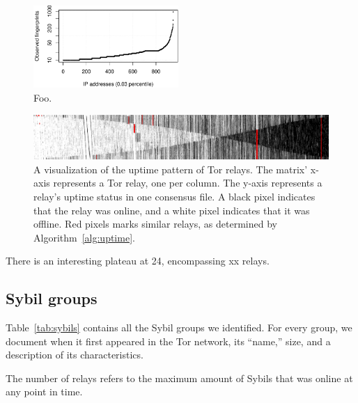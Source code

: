 \begin{figure}[t]
	\centering
	\includegraphics[width=0.49\textwidth]{diagrams/fingerprints.pdf}
	\caption{Foo.}
	\label{fig:fingerprints}
\end{figure}

\begin{figure}[t]
	\centering
	\includegraphics[width=\textwidth]{diagrams/uptimes.pdf}
	\caption{A visualization of the uptime pattern of Tor relays.  The matrix'
	x-axis represents a Tor relay, one per column.  The y-axis represents a
	relay's uptime status in one consensus file.  A black pixel indicates that
	the relay was online, and a white pixel indicates that it was offline.  Red
	pixels marks similar relays, as determined by Algorithm~\ref{alg:uptime}.}
	\label{fig:fingerprints}
\end{figure}

There is an interesting plateau at 24, encompassing xx relays.

\subsection{Sybil groups}
\label{sec:sybil_groups}
Table~\ref{tab:sybils} contains all the Sybil groups we identified.  For every
group, we document when it first appeared in the Tor network, its ``name,''
size, and a description of its characteristics.

The number of relays refers to the maximum amount of Sybils that was online at
any point in time.

